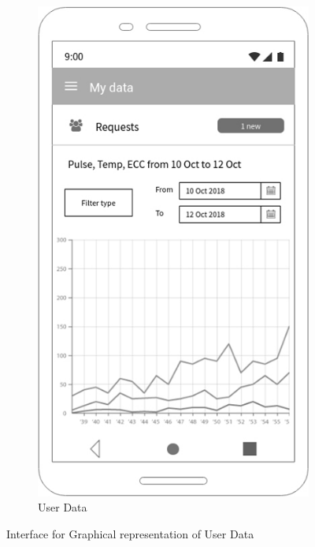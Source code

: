 \begin{figure}[h!]
\begin{subfigure}[b]{0.4\linewidth}
    \includegraphics[width=\linewidth]{img/mockup/u_data.jpg}
    \caption{User Data}
  \end{subfigure}
\caption{Interface for Graphical representation of User Data }
 \end{figure}

